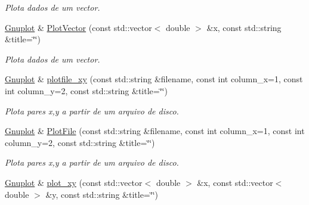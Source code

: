 \begin{DoxyCompactItemize}
\begin{DoxyCompactList}\small\item\em Plota dados de um vector. \end{DoxyCompactList}\item 
\hypertarget{classGnuplot_ab478d91039848a22733fc7a0f7c25f04}{\hyperlink{classGnuplot}{Gnuplot} \& \hyperlink{classGnuplot_ab478d91039848a22733fc7a0f7c25f04}{Plot\-Vector} (const std\-::vector$<$ double $>$ \&x, const std\-::string \&title=\char`\"{}\char`\"{})}\label{classGnuplot_ab478d91039848a22733fc7a0f7c25f04}

\begin{DoxyCompactList}\small\item\em Plota dados de um vector. \end{DoxyCompactList}\item 
\hypertarget{classGnuplot_af226f395310d3c5c4f8b4d2aaf5d8823}{\hyperlink{classGnuplot}{Gnuplot} \& \hyperlink{classGnuplot_af226f395310d3c5c4f8b4d2aaf5d8823}{plotfile\-\_\-xy} (const std\-::string \&filename, const int column\-\_\-x=1, const int column\-\_\-y=2, const std\-::string \&title=\char`\"{}\char`\"{})}\label{classGnuplot_af226f395310d3c5c4f8b4d2aaf5d8823}

\begin{DoxyCompactList}\small\item\em Plota pares x,y a partir de um arquivo de disco. \end{DoxyCompactList}\item 
\hypertarget{classGnuplot_a68d5b282f0fc0d65d432009b55705cbd}{\hyperlink{classGnuplot}{Gnuplot} \& \hyperlink{classGnuplot_a68d5b282f0fc0d65d432009b55705cbd}{Plot\-File} (const std\-::string \&filename, const int column\-\_\-x=1, const int column\-\_\-y=2, const std\-::string \&title=\char`\"{}\char`\"{})}\label{classGnuplot_a68d5b282f0fc0d65d432009b55705cbd}

\begin{DoxyCompactList}\small\item\em Plota pares x,y a partir de um arquivo de disco. \end{DoxyCompactList}\item 
\hypertarget{classGnuplot_a777b6a5474951d6d023dff4237d80a2b}{\hyperlink{classGnuplot}{Gnuplot} \& \hyperlink{classGnuplot_a777b6a5474951d6d023dff4237d80a2b}{plot\-\_\-xy} (const std\-::vector$<$ double $>$ \&x, const std\-::vector$<$ double $>$ \&y, const std\-::string \&title=\char`\"{}\char`\"{})}\label{classGnuplot_a777b6a5474951d6d023dff4237d80a2b}


\end{DoxyCompactItemize}
